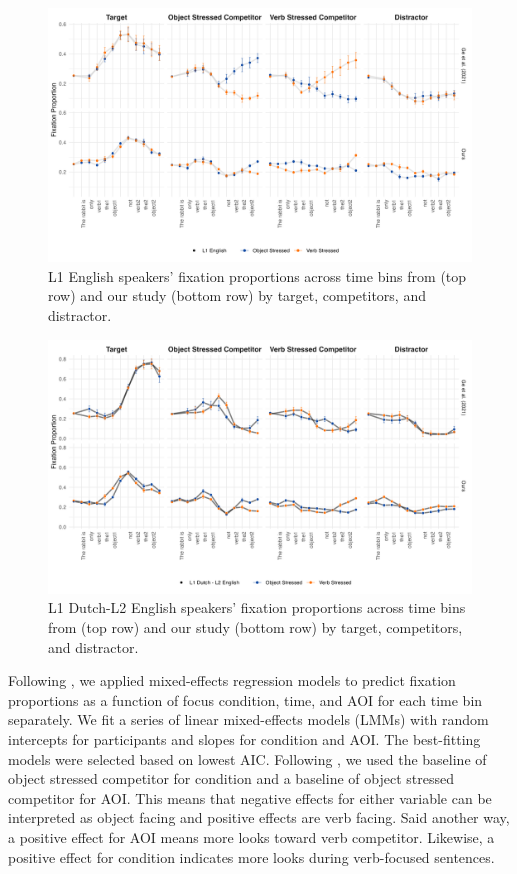 \begin{figure}[H]  %
    \centering
    \includegraphics[width=\textwidth,height=\textheight,keepaspectratio]{viz/english_fix.png}
    \caption{L1 English speakers' fixation proportions across time bins from \textcite{ge2021a} (top row) and our study (bottom row) by target, competitors, and distractor.}
    \label{fig:english_fix}
\end{figure}

\begin{figure}  %
    \centering
    \includegraphics[width=\textwidth,height=\textheight,keepaspectratio]{viz/dutch_fix.png}
    \caption{L1 Dutch-L2 English speakers' fixation proportions across time bins from \textcite{ge2021a} (top row) and our study (bottom row) by target, competitors, and distractor.}
    \label{fig:dutch_fix}
\end{figure}

Following \textcite{ge2021a}, we applied mixed-effects regression models to predict fixation proportions as a function of focus condition, time, and AOI for each time bin separately. We fit a series of linear mixed-effects models (LMMs) with random intercepts for participants and slopes for condition and AOI. The best-fitting models were selected based on lowest AIC. Following \textcite{ge2021a}, we used the baseline of object stressed competitor for condition and a baseline of object stressed competitor for AOI. This means that negative effects for either variable can be interpreted as object facing and positive effects are verb facing. Said another way, a positive effect for AOI means more looks toward verb competitor. Likewise, a positive effect for condition indicates more looks during verb-focused sentences.

